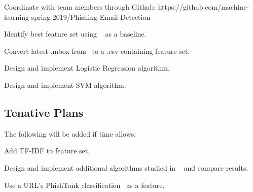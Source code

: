 \documentclass[10pt,twocolumn,letterpaper]{article}
\begin{document}
\begin{description}
\item Coordinate with team members through Github: https://github.com/machine-learning-spring-2019/Phishing-Email-Detection
\item Identify best feature set using ~\cite{diego} as a baseline.
\item Convert latest .mbox from~\cite{monkey} to a .csv containing feature set.
\item Design and implement Logistic Regression algorithm.
\item Design and implement SVM algorithm.
\subsection{Tenative Plans}
The following will be added if time allows:
\item Add TF-IDF to feature set.
\item Design and implement additional algorithms studied in ~\cite{CENreport} and compare results.
\item Use a URL's PhishTank classification~\cite{phish} as a feature.
\end{description}
\pagebreak

{\small


}
\end{document}
